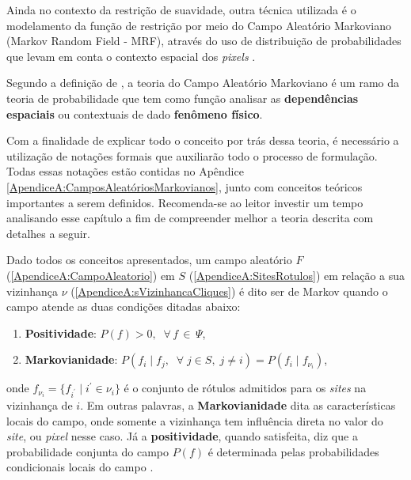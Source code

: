{{\begin{figure}[H]
	
	\label{fig:imgCap3PesosVizinhanca}
\end{figure}   



Ainda no contexto da restrição de suavidade, outra técnica utilizada é o modelamento da função de restrição por meio do Campo Aleatório Markoviano (Markov Random Field - \acs{MRF}), através do uso de distribuição de probabilidades que levam em conta o contexto espacial dos \textit{pixels} \cite[p. 71]{salvadeo2013filtragem}.  

Segundo a definição de , a teoria do Campo Aleatório Markoviano é um ramo da teoria de probabilidade que tem como função analisar as \textbf{dependências espaciais} ou contextuais de dado \textbf{fenômeno físico}. 

Com a finalidade de explicar todo o conceito por trás dessa teoria, é necessário a utilização de notações formais que auxiliarão todo o processo de formulação. Todas essas notações estão contidas no Apêndice \ref{ApendiceA:CamposAleatóriosMarkovianos}, junto com conceitos teóricos importantes a serem definidos. Recomenda-se ao leitor investir um tempo analisando esse capítulo a fim de compreender melhor a teoria descrita com detalhes a seguir.    

Dado todos os conceitos apresentados, um campo aleatório $F$ (\ref{ApendiceA:CampoAleatorio}) em $S$ (\ref{ApendiceA:SitesRotulos}) em relação a sua vizinhança $\nu$ (\ref{ApendiceA:sVizinhancaCliques}) é dito ser de Markov quando o campo atende as duas condições ditadas abaixo:  


\begin{enumerate}
	\item \textbf{Positividade}: $P(f) > 0, \;\; \forall\, f \,\in\, \varPsi$,
	\item \textbf{Markovianidade}: $P(f_{i} \mid f_{j},\;\; \forall \; j \in S,\; j \neq i) = P(f_{i}\mid f_{\nu_{i}})$,
\end{enumerate}

\noindent onde $f_{\nu_{i}} = \{f_{i^{'}} \mid i^{'} \in \nu_{i} \} $ é o conjunto de rótulos admitidos para os \textit{sites} na vizinhança de $i$. Em outras palavras, a \textbf{Markovianidade} dita as características locais do campo, onde somente a vizinhança tem influência direta no valor do \textit{site}, ou \textit{pixel} nesse caso. Já a \textbf{positividade}, quando satisfeita, diz que a probabilidade conjunta do campo $P(f)$ é determinada pelas probabilidades condicionais locais do campo \cite{li2009markov}.  

}}
